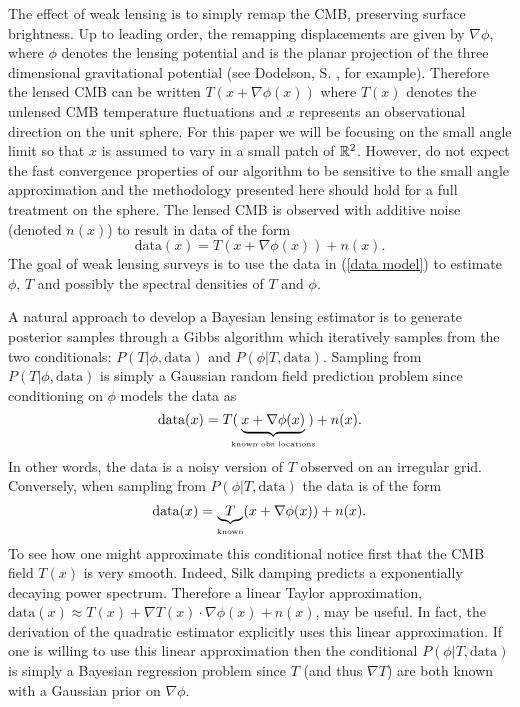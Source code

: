 \documentclass[noinfoline]{imsart}
\begin{document}
The effect of weak lensing is to simply remap the CMB, preserving surface brightness.   Up to leading order, the remapping  displacements are given by $\nabla \phi$, where $\phi$ denotes the lensing potential and is the planar projection of the three dimensional gravitational potential (see Dodelson, S. \cite{dodelson2003modern}, for example). Therefore the lensed CMB can  be written $T(x + \nabla \phi(x))$ where $T(x)$ denotes the unlensed CMB temperature fluctuations and $x$ represents an observational direction on the unit sphere. For this paper we will be focusing on the small angle limit  so that $x$ is assumed to vary in a small patch of $ \Bbb R^2$. However, do not expect the fast convergence properties of our algorithm to be sensitive to the small angle approximation and the methodology presented here should hold for a full treatment on the sphere.  The lensed CMB is observed with additive noise (denoted $n(x)$) to result in data of the form
\begin{equation}
\label{data model}
 \text{data}(x)= T(x + \nabla \phi(x))+ n(x).
\end{equation}
The goal of weak lensing surveys is to use the data in (\ref{data model}) to  estimate $\phi$, $T$  and possibly  the spectral densities of $T$ and $\phi$.  

A natural approach to develop a Bayesian lensing estimator is to generate posterior samples through a Gibbs algorithm which iteratively samples from the two conditionals: $P(T |  \phi,\text{data})$ and $P(\phi | T,  \text{data})$.
Sampling from $P(T |  \phi,\text{data})$ is simply a Gaussian random field prediction problem since conditioning on $\phi$ models the data as
\[
\text{data}(x) = T(\!\!\!\underbrace{x+\nabla\phi(x)}_\text{\tiny known obs locations}\!\!\!) + n(x).
\]
In other words, the data is a noisy version of  $T$ observed on an irregular grid. 
Conversely, when sampling from $P(\phi | T,\text{data})$ the data is of the form
\[
\text{data}(x) = \underbrace{\!\!T\!\!}_{\text{\tiny known}}(x+\nabla\phi(x)) + n(x). 
\]
To see how one might approximate this conditional notice first that the CMB field $T(x)$ is very smooth. Indeed, Silk damping  predicts  a exponentially decaying power spectrum. Therefore a linear Taylor approximation,  $\text{data}(x) \approx T(x) + \nabla T(x)\cdot \nabla\phi(x) + n(x)$, may be useful. In fact, the derivation of the quadratic estimator explicitly uses this linear approximation. 
If one is willing to use this linear approximation then the conditional $P(\phi | T,\text{data})$ is simply a Bayesian regression problem since $T$ (and thus $\nabla T$) are both known with a Gaussian prior on $\nabla \phi$.
\end{document}
